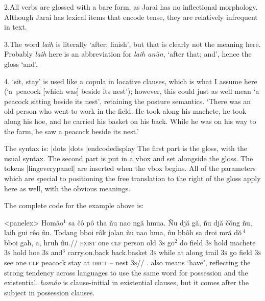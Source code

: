 2.\enspace All verbs are glossed with a bare form, as Jarai has
no inflectional morphology. Although Jarai has lexical items that
encode tense, they are relatively infrequent in text.

3.\enspace The word {\it laih} is literally `after; finish', but
that is clearly not the meaning here. Probably {\it laih} here is
an abbreviation for {\it laih an\u{u}n}, `after that; and', hence
the gloss `and'.

4. `sit, stay' is used like a copula in
locative clauses, which is what I assume here (`a~peacock
[which was] beside its nest'); however, this could just as well
mean `a peacock sitting beside its nest', retaining the posture
semantics.
\endpanel
\bigskip
`There was an old person who went to work in the field. He took
along his machete, he took along his hoe, and he carried his
basket on his back. While he was on his way to the farm, he saw a
peacock beside its nest.'
\xe
\endframedisplay

The syntax is:
\codedisplay
\beginglpanel |dots \endgl |dots \endpanel
|endcodedisplay
The first part is the gloss, with the usual syntax.  The second
part is put in a vbox and set alongside the gloss. The tokens
|lingeverypanel| are inserted when the vbox begins. All of the
parameters which are special to positioning the free translation
to the right of the gloss apply here as well, with the obvious
meanings.

The complete code for the example above is:

\codedisplay
\ex[everypanel=\footnotesize]<panelex>
\let\\=\textsc
\beginglpanel[ssratio=.5,glhangstyle=none]
\gla Hom\^{a}o$^1$ sa \v{c}\^{o} p\^{o} tha  \~{n}u nao ng\u{a}
hmua. \~{N}u dj\u{a} g\u{a}, \~{n}u dj\u{a} \v{c}\u{o}ng \~{n}u,
laih gui r\^{e}o \~{n}u. Todang bboi r\^{o}k jolan \~{n}u nao
hma, \~{n}u bb\^{o}h sa droi mr\u{a} d\u{o}$\,^4$ bboi gah, a, hruh
\~{n}u.//
\glb \\{exist} one \\{clf} person old \\{3s} go$^2$ do field
\\{3s} hold machete \\{3s} hold hoe \\{3s} and$^3$ carry.on.back
back.basket \\{3s} while at along trail \\{3s} go field \\{3s}
see one \\{clf} peacock stay at \\{drct} -- nest \\{3s}//
. also means `have', reflecting the
strong tendency across languages to use the same word for
possession and the existential. {\it hom\^{a}o} is clause-initial
in existential clauses, but it comes after the subject in
possession clauses.

